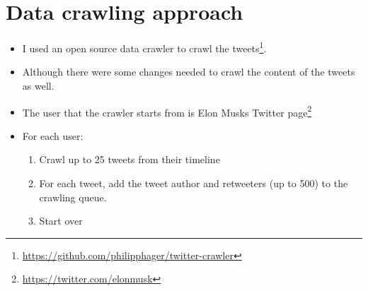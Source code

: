 \section{Data crawling approach}
\label{sec:data-crawling-approach}
\begin{itemize}
    \item I used an open source data crawler to crawl the tweets\footnote{\url{https://github.com/philipphager/twitter-crawler}}.
    \item Although there were some changes needed to crawl the content of the tweets as well.
    \item The user that the crawler starts from is Elon Musks Twitter page\footnote{\url{https://twitter.com/elonmusk}}
    \item For each user:
    \begin{enumerate}
        \item Crawl up to 25 tweets from their timeline
        \item For each tweet, add the tweet author and retweeters (up to 500) to the crawling queue.
        \item Start over
    \end{enumerate}
\end{itemize}
